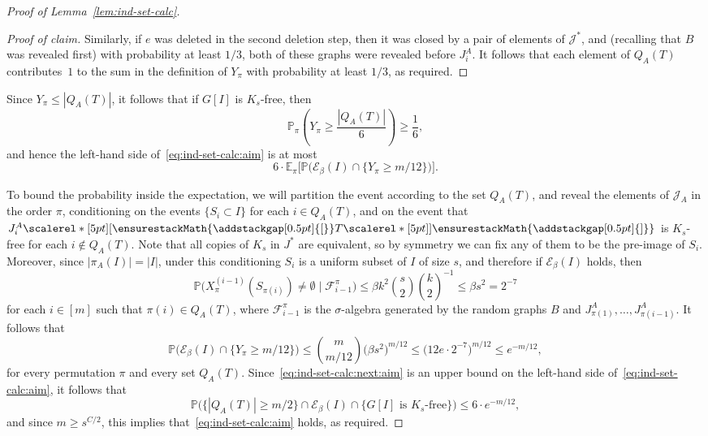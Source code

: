 \documentclass[12pt,reqno]{amsart}
\newcommand\pig[1]{\scalerel*[5pt]{\normalsize#1}{%
  \ensurestackMath{\addstackgap[0.5pt]{\normalsize#1}}}}
\theoremstyle{remark}
\numberwithin{theorem}{section}
\renewcommand{\(}{\bigl(}
\renewcommand{\)}{\bigr)\vphantom{)}}
\newcommand{\cF}{\mathcal F}
\newcommand{\cE}{\mathcal E}
\newcommand{\cJ}{\mathcal J}
\renewcommand{\le}{\leqslant}
\renewcommand{\ge}{\geqslant}
\newcommand{\Ex}{\mathbb E}
\renewcommand{\Pr}{\mathbb{P}}
\begin{document}
\begin{proof}[Proof of Lemma~\ref{lem:ind-set-calc}]
\begin{proof}[Proof of claim]
Similarly, if $e$ was deleted in the second deletion step, then it was closed by a pair of elements of $\cJ^*$, and (recalling that $B$ was revealed first) with probability at least $1/3$, both of these graphs were revealed before $J^A_i$. It follows that each element of $Q_A(T)$ contributes~$1$ to the sum in the definition of $Y_\pi$ with probability at least $1/3$, as required.
\end{proof}

Since $Y_\pi \le |Q_A(T)|$, it follows that if $G[I]$ is $K_s$-free, then
$$\Pr_\pi\left( Y_\pi \ge \frac{|Q_A(T)|}{6} \right) \ge \frac{1}{6},$$
and hence the left-hand side of~\eqref{eq:ind-set-calc:aim} is at most
\begin{equation}\label{eq:ind-set-calc:next:aim}
6 \cdot \Ex_\pi\Big[ \Pr\Big( \cE_\beta(I) \cap \big\{ Y_\pi \ge m/12 \big\} \Big) \Big].
\end{equation}

To bound the probability inside the expectation, we will partition the event according to the set $Q_A(T)$, and reveal the elements of $\cJ_A$ in the order $\pi$, conditioning on the events $\{ S_i \subset I \}$ for each $i \in Q_A(T)$, and on the event that $J_i^A\pig[ T \pig]$ is $K_s$-free for each $i \not\in Q_A(T)$. Note that all copies of $K_s$ in $J^*$ are equivalent, so by symmetry we can fix any of them to be the pre-image of $S_i$. Moreover, since $|\pi_A(I)| = |I|$, under this conditioning $S_i$ is a uniform subset of $I$ of size $s$, and therefore if $\cE_\beta(I)$ holds, then 
\begin{equation}\label{eq:supersaturation}
\Pr\Big( X_\pi^{(i-1)}(S_{\pi(i)}) \ne \emptyset \;\big|\; \cF_{i-1}^\pi \Big) \le \beta k^2 {s \choose 2} {k \choose 2}^{-1} \le \beta s^2 = 2^{-7}
\end{equation}
for each $i \in [m]$ such that $\pi(i) \in Q_A(T)$, where $\cF_{i-1}^\pi$ is the $\sigma$-algebra generated by the random graphs $B$ and $J^A_{\pi(1)},\ldots,J^A_{\pi(i-1)}$. It follows that
$$\Pr\Big( \cE_\beta(I) \cap \big\{ Y_\pi \ge m/12 \big\} \Big) \le {m \choose m/12} \big( \beta s^2 \big)^{m/12} \le \big( 12e \cdot 2^{-7} \big)^{m/12} \le e^{-m/12},$$
for every permutation $\pi$ and every set $Q_A(T)$. Since~\eqref{eq:ind-set-calc:next:aim} is an upper bound on the left-hand side of~\eqref{eq:ind-set-calc:aim}, it follows that
$$\Pr\Big( \big\{ |Q_A(T)| \ge m/2 \big\} \cap \cE_\beta(I) \cap \big\{ G[I] \text{ is $K_s$-free} \big\} \Big) \le 6 \cdot e^{-m/12},$$
and since $m \ge s^{C/2}$, this implies that~\eqref{eq:ind-set-calc:aim} holds, as required. 
\end{proof}
\end{document}

